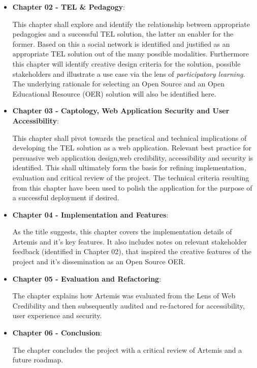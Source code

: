 \begin{itemize}

\item\textbf{Chapter 02 - TEL \& Pedagogy}:

This chapter shall explore and identify the relationship between appropriate pedagogies and a successful TEL solution, the latter an enabler for the former. Based on this a social network is identified and justified as an appropriate TEL solution out of the many possible modalities. Furthermore this chapter will identify creative design criteria for the solution, possible stakeholders and illustrate a use case via the lens of \textit{participatory learning}. The underlying rationale for selecting an Open Source and an Open Educational Resource (OER)  solution will also be identified here.


\item\textbf {Chapter 03 - Captology, Web Application Security and User Accessibility}:

This chapter shall pivot towards the practical and technical implications of developing the TEL solution as a web application. Relevant best practice for persuasive web application design,web credibility, accessibility and security is identified. This shall ultimately form the basis for refining implementation, evaluation and critical review of the project. The technical criteria resulting from this chapter have been used to polish the application for the  purpose of a successful deployment if desired.


\item\textbf {Chapter 04 - Implementation and Features}:

As the title suggests, this chapter covers the implementation details of Artemis and it's key features. It also includes notes on relevant stakeholder feedback (identified in Chapter 02), that inspired the creative features of the project and it's dissemination as an Open Source OER.

\item\textbf {Chapter 05 - Evaluation and Refactoring}:

The chapter explains how Artemis was evaluated from the Lens of Web Credibility and then subsequently audited and re-factored for accessibility, user experience and security. 

\item\textbf {Chapter 06 - Conclusion}:

The chapter concludes the project with a critical review of Artemis and a future roadmap.

\end{itemize}



